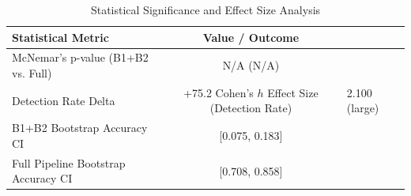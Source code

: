 \begin{table}[h]
\centering
\caption{Statistical Significance and Effect Size Analysis}
\label{tab:semantic_stats}
\begin{tabular}{lc}
\hline
\textbf{Statistical Metric} & \textbf{Value / Outcome} \\ \hline
McNemar's p-value (B1+B2 vs. Full) & N/A (N/A) \\
Detection Rate Delta & +75.2%
Cohen's $h$ Effect Size (Detection Rate) & 2.100 (large) \\
B1+B2 Bootstrap Accuracy CI & [0.075, 0.183] \\
Full Pipeline Bootstrap Accuracy CI & [0.708, 0.858] \\
\hline
\end{tabular}
\end{table}
